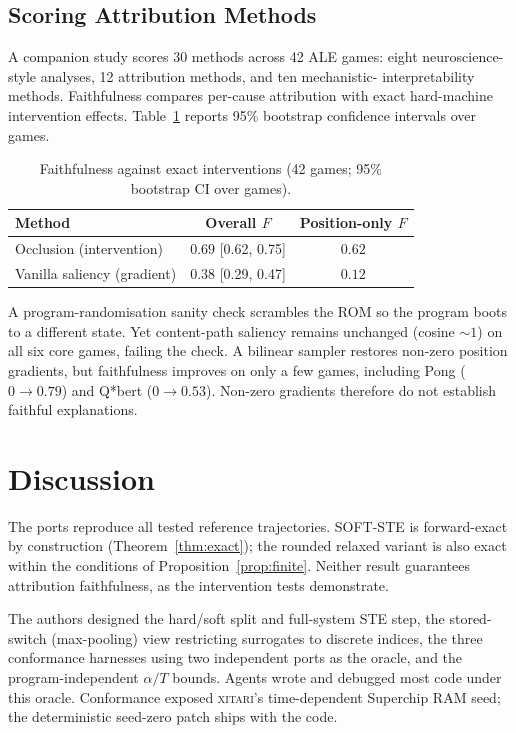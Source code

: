 \documentclass[letterpaper]{article} %
\begin{document}
\subsection{Scoring Attribution Methods}

A companion study scores 30 methods across 42 ALE
games: eight neuroscience-style analyses, 12
attribution methods, and ten mechanistic-
interpretability methods. Faithfulness compares
per-cause attribution with exact hard-machine
intervention effects. Table~\ref{tab:faithfulness}
reports 95\% bootstrap confidence intervals
over games.

\begin{table}[t]
\centering
\setlength{\tabcolsep}{3pt}
\small
\caption{Faithfulness against exact interventions
(42 games; 95\% bootstrap CI over games).}
\label{tab:faithfulness}
\begin{tabular}{lcc}
\toprule
Method & Overall $F$ & Position-only $F$ \\
\midrule
Occlusion (intervention) & $0.69$ [0.62, 0.75] & $0.62$ \\
Vanilla saliency (gradient) & $0.38$ [0.29, 0.47] & $0.12$ \\
\bottomrule
\end{tabular}
\end{table}

A program-randomisation sanity check
\citep{adebayo2018sanity} scrambles the ROM so the
program boots to a different state. Yet content-path
saliency remains unchanged (cosine ${\sim}1$) on all
six core games, failing the check. A bilinear
sampler restores non-zero position gradients, but
faithfulness improves on only a few games, including
Pong ($0\to0.79$) and Q*bert ($0\to0.53$).
Non-zero gradients therefore do not establish
faithful explanations.

\section{Discussion}

The ports reproduce all tested reference trajectories.
SOFT-STE is forward-exact by construction
(Theorem~\ref{thm:exact}); the rounded relaxed variant
is also exact within the conditions of
Proposition~\ref{prop:finite}. Neither result
guarantees attribution faithfulness, as the
intervention tests demonstrate.

The authors designed the hard/soft split and
full-system STE step, the stored-switch
(max-pooling) view restricting surrogates to
discrete indices, the three conformance harnesses
using two independent ports as the oracle, and
the program-independent $\alpha/T$ bounds.
Agents wrote and debugged most code under this
oracle. Conformance exposed \textsc{xitari}'s
time-dependent Superchip RAM seed; the deterministic
seed-zero patch ships with the code.
\end{document}
